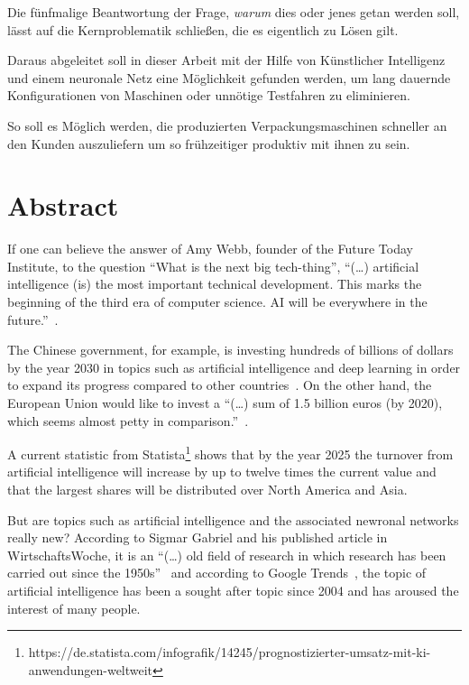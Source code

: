 Die fünfmalige Beantwortung der Frage, \textit{warum} dies oder jenes getan werden soll, lässt auf die Kernproblematik
schließen, die es eigentlich zu Lösen gilt.

Daraus abgeleitet soll in dieser Arbeit mit der Hilfe von Künstlicher Intelligenz und einem neuronale Netz eine
Möglichkeit gefunden werden, um lang dauernde Konfigurationen von Maschinen oder unnötige Testfahren zu eliminieren.

So soll es Möglich werden, die produzierten Verpackungsmaschinen schneller an den Kunden auszuliefern um so frühzeitiger
produktiv mit ihnen zu sein.

\newpage

\section{Abstract}
\label{sec:abstract}
If one can believe the answer of Amy Webb, founder of the Future Today Institute, to the question \enquote{What is the
next big tech-thing}, \enquote{(\ldots) artificial intelligence (is) the most important technical development. This
marks the beginning of the third era of computer science. AI will be everywhere in the
future.}~\cite{article_einleitung_dub_aw}.

The Chinese government, for example, is investing hundreds of billions of dollars by the year 2030 in topics such as
artificial intelligence and deep learning in order to expand its progress compared to other
countries~\cite{article_einleitung_css}. On the other hand, the European Union would like to invest a \enquote{(\ldots)
sum of 1.5 billion euros (by 2020), which seems almost petty in comparison.}~\cite{article_einleitung_ww_sg}.

A current statistic from
Statista\footnote{https://de.statista.com/infografik/14245/prognostizierter-umsatz-mit-ki-anwendungen-weltweit} shows
that by the year 2025 the turnover from artificial intelligence will increase by up to twelve times the current value
and that the largest shares will be distributed over North America and Asia.

But are topics such as artificial intelligence and the associated newronal networks really new? According to Sigmar
Gabriel and his published article in WirtschaftsWoche, it is an \enquote{(\ldots) old field of research in which research
has been carried out since the 1950s}~\cite{article_einleitung_ww_sg} and according to Google
Trends~\cite{online_einleitung_googletrends}, the topic of artificial intelligence has been a sought after topic since
2004 and has aroused the interest of many people.

